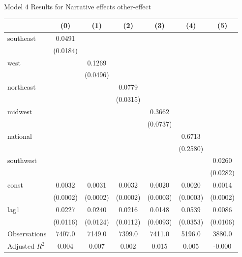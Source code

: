\caption{Model 4 Results for Narrative effects other-effect}
\begin{tabular}{lcccccc}
\toprule
 & (0) & (1) & (2) & (3) & (4) & (5) \\
\midrule
southeast & 0.0491 &  &  &  &  &  \\
\vspace{0.2cm}
 & (0.0184) &  &  &  &  &  \\
west &  & 0.1269 &  &  &  &  \\
\vspace{0.2cm}
 &  & (0.0496) &  &  &  &  \\
northeast &  &  & 0.0779 &  &  &  \\
\vspace{0.2cm}
 &  &  & (0.0315) &  &  &  \\
midwest &  &  &  & 0.3662 &  &  \\
\vspace{0.2cm}
 &  &  &  & (0.0737) &  &  \\
national &  &  &  &  & 0.6713 &  \\
\vspace{0.2cm}
 &  &  &  &  & (0.2580) &  \\
southwest &  &  &  &  &  & 0.0260 \\
\vspace{0.2cm}
 &  &  &  &  &  & (0.0282) \\
const & 0.0032 & 0.0031 & 0.0032 & 0.0020 & 0.0020 & 0.0014 \\
\vspace{0.2cm}
 & (0.0002) & (0.0002) & (0.0002) & (0.0003) & (0.0003) & (0.0002) \\
lag1 & 0.0227 & 0.0240 & 0.0216 & 0.0148 & 0.0539 & 0.0086 \\
\vspace{0.2cm}
 & (0.0116) & (0.0124) & (0.0112) & (0.0093) & (0.0353) & (0.0106) \\
\midrule
Observations & 7407.0 & 7149.0 & 7399.0 & 7411.0 & 5196.0 & 3880.0 \\
Adjusted $R^2$ & 0.004 & 0.007 & 0.002 & 0.015 & 0.005 & -0.000 \\
\bottomrule
\end{tabular}